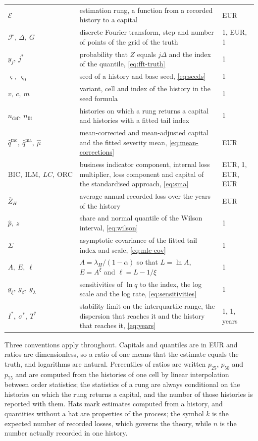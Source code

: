 \begin{table}[htbp]
\begin{tabularx}{\textwidth}{lXl}
$\mathcal{E}$ & estimation rung, a function from a recorded history to a capital & EUR \\
$\mathcal{F},\ \Delta,\ G$ & discrete Fourier transform, step and number of points of the grid of the truth & 1, EUR, 1 \\
$y_j,\ j^\ast$ & probability that $Z$ equals $j\Delta$ and the index of the quantile, \cref{eq:fft-truth} & 1 \\
$\varsigma,\ \varsigma_0$ & seed of a history and base seed, \cref{eq:seeds} & 1 \\
$v,\ c,\ m$ & variant, cell and index of the history in the seed formula & 1 \\
$n_{\mathrm{def}},\ n_{\mathrm{fit}}$ & histories on which a rung returns a capital and histories with a fitted tail index & 1 \\
$\hat q^{\mathrm{mc}},\ \hat q^{\mathrm{ma}},\ \hat\mu$ & mean-corrected and mean-adjusted capital and the fitted severity mean, \cref{eq:mean-corrections} & EUR \\
$\mathrm{BIC},\ \mathrm{ILM},\ LC,\ \mathrm{ORC}$ & business indicator component, internal loss multiplier, loss component and capital of the standardised approach, \cref{eq:sma} & EUR, 1, EUR, EUR \\
$\overline{Z}_H$ & average annual recorded loss over the years of the history & EUR \\
$\hat p,\ z$ & share and normal quantile of the Wilson interval, \cref{eq:wilson} & 1 \\
$\Sigma$ & asymptotic covariance of the fitted tail index and scale, \cref{eq:mle-cov} & 1 \\
$A,\ E,\ \ell$ & $A=\lambda_H/(1-\alpha)$ so that $L=\ln A$, $E=A^{\xi}$ and $\ell=L-1/\xi$ & 1 \\
$g_\xi,\ g_\beta,\ g_\lambda$ & sensitivities of $\ln q$ to the index, the log scale and the log rate, \cref{eq:sensitivities} & 1 \\
$I^\ast,\ \sigma^\ast,\ T^\ast$ & stability limit on the interquartile range, the dispersion that reaches it and the history that reaches it, \cref{eq:years} & 1, 1, years \\
\bottomrule
\end{tabularx}
\end{table}

Three conventions apply throughout. Capitals and quantiles are in EUR and ratios are dimensionless, so a ratio of one means that the estimate equals the truth, and logarithms are natural. Percentiles of ratios are written $p_{25}$, $p_{50}$ and $p_{75}$ and are computed from the histories of one cell by linear interpolation between order statistics; the statistics of a rung are always conditional on the histories on which the rung returns a capital, and the number of those histories is reported with them.
Hats mark estimates computed from a history, and quantities without a hat are properties of the process; the symbol $k$ is the expected number of recorded losses, which governs the theory, while $n$ is the number actually recorded in one history.
